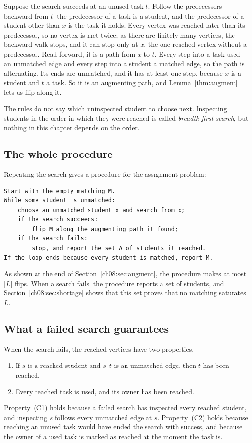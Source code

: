 Suppose the search succeeds at an unused task $t$. Follow the predecessors backward from $t$: the predecessor of a task is a student, and the predecessor of a student other than $x$ is the task it holds. Every vertex was reached later than its predecessor, so no vertex is met twice; as there are finitely many vertices, the backward walk stops, and it can stop only at $x$, the one reached vertex without a predecessor. Read forward, it is a path from $x$ to $t$. Every step into a task used an unmatched edge and every step into a student a matched edge, so the path is alternating. Its ends are unmatched, and it has at least one step, because $x$ is a student and $t$ a task. So it is an augmenting path, and Lemma~\ref{thm:augment} lets us flip along it.

The rules do not say which uninspected student to choose next. Inspecting students in the order in which they were reached is called \emph{breadth-first search}, but nothing in this chapter depends on the order.

\subsection*{The whole procedure}
Repeating the search gives a procedure for the assignment problem:
\par\noindent\begin{minipage}{\linewidth}
\begin{lstlisting}
Start with the empty matching M.
While some student is unmatched:
    choose an unmatched student x and search from x;
    if the search succeeds:
        flip M along the augmenting path it found;
    if the search fails:
        stop, and report the set A of students it reached.
If the loop ends because every student is matched, report M.
\end{lstlisting}
\end{minipage}\par
As shown at the end of Section~\ref{ch08:sec:augment}, the procedure makes at most $|L|$ flips. When a search fails, the procedure reports a set of students, and Section~\ref{ch08:sec:shortage} shows that this set proves that no matching saturates $L$.

\subsection*{What a failed search guarantees}
When the search fails, the reached vertices have two properties.
\begin{enumerate}
\item[(C1)] If $s$ is a reached student and $s$--$t$ is an unmatched edge, then $t$ has been reached.
\item[(C2)] Every reached task is used, and its owner has been reached.
\end{enumerate}
Property~(C1) holds because a failed search has inspected every reached student, and inspecting $s$ follows every unmatched edge at $s$. Property~(C2) holds because reaching an unused task would have ended the search with success, and because the owner of a used task is marked as reached at the moment the task is.

